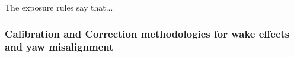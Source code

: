The exposure rules say that...



\subsubsection{Calibration and Correction methodologies for wake effects and yaw misalignment}\label{subsubsec:calibration_and_correctio}

